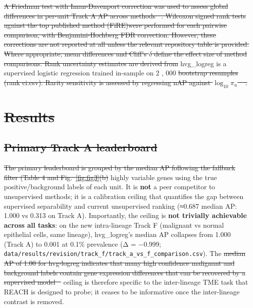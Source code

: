 \documentclass[10pt]{article}
\providecommand{\DIFaddtex}[1]{{\protect\color{trackgreen}#1}} %
\providecommand{\DIFdeltex}[1]{{\protect\color{red}\sout{#1}}}                      %
\providecommand{\DIFaddbegin}{} %
\providecommand{\DIFaddend}{} %
\providecommand{\DIFdelbegin}{} %
\providecommand{\DIFdelend}{} %
\providecommand{\DIFadd}[1]{\texorpdfstring{\DIFaddtex{#1}}{#1}} %
\providecommand{\DIFdel}[1]{\texorpdfstring{\DIFdeltex{#1}}{}} %
\newcommand{\DIFscaledelfig}{0.5}
\newlength{\DIFdelgraphicswidth} %
\newlength{\DIFdelgraphicsheight} %
\newcommand{\DIFaddincludegraphics}[2][]{{\color{trackgreen}\fbox{\DIFOincludegraphics[#1]{#2}}}} %
\newcommand{\DIFdelincludegraphics}[2][]{%
\sbox{\DIFdelgraphicsbox}{\DIFOincludegraphics[#1]{#2}}%
\settoboxwidth{\DIFdelgraphicswidth}{\DIFdelgraphicsbox} %
\settoboxtotalheight{\DIFdelgraphicsheight}{\DIFdelgraphicsbox} %
\scalebox{\DIFscaledelfig}{%
\parbox[b]{\DIFdelgraphicswidth}{\usebox{\DIFdelgraphicsbox}\\[-\baselineskip] \rule{\DIFdelgraphicswidth}{0em}}\llap{\resizebox{\DIFdelgraphicswidth}{\DIFdelgraphicsheight}{%
\setlength{\unitlength}{\DIFdelgraphicswidth}%
\begin{picture}(1,1)%
\thicklines\linethickness{2pt} %
{\color[rgb]{1,0,0}\put(0,0){\framebox(1,1){}}}%
{\color[rgb]{1,0,0}\put(0,0){\line( 1,1){1}}}%
{\color[rgb]{1,0,0}\put(0,1){\line(1,-1){1}}}%
\end{picture}%
}\hspace*{3pt}}} %
} %
\DeclareRobustCommand{\DIFaddbegin}{\DIFOaddbegin \let\includegraphics\DIFaddincludegraphics} %
\DeclareRobustCommand{\DIFaddend}{\DIFOaddend \let\includegraphics\DIFOincludegraphics} %
\DeclareRobustCommand{\DIFdelbegin}{\DIFOdelbegin \let\includegraphics\DIFdelincludegraphics} %
\DeclareRobustCommand{\DIFdelend}{\DIFOaddend \let\includegraphics\DIFOincludegraphics} %
\begin{document}
\DIFdelbegin \DIFdel{A Friedman test with Iman-Davenport correction was used to assess global differences in per-unit Track A AP across methods\mbox{%
\cite{gorodkin2004comparing}}\hskip0pt%
. Wilcoxon signed rank tests against the top published method (FiRE)were performed for each pairwise comparison, with Benjamini-Hochberg FDR correction. However, these corrections are not reported at all unless the relevant repository table is provided. Where appropriate, mean differences and Cliff’s $\delta$ define the effect size of method comparisons. Rank uncertainty estimates are derived from }\DIFdelend \DIFaddbegin \DIFadd{hvg\_logreg is a supervised logistic regression trained in-sample on
}\DIFaddend 2\DIFdelbegin %
\DIFdelend ,\DIFdelbegin %
\DIFdelend 000 \DIFdelbegin \DIFdel{bootstrap resamples (rank ci.csv). Rarity sensitivity is assessed by regressing nAP against $\log_{10} \pi_u$ \mbox{%
\cite{saito2015precision,davis2006relationship}}\hskip0pt%
.
}%

\section{\DIFdel{Results}}
\addtocounter{section}{-1}%

\subsection{\DIFdel{Primary Track A leaderboard}}
\addtocounter{subsection}{-1}%

\DIFdel{The primary leaderboard is grouped by the median AP following the fallback filter (Table 4 and Fig.~\ref{fig:fig3}(b) }\DIFdelend \DIFaddbegin \DIFadd{highly variable genes using the true positive/background labels of
each unit. It is }\textbf{\DIFadd{not}} \DIFadd{a peer competitor to unsupervised methods;
it is a calibration ceiling that quantifies the gap between supervised
separability and current unsupervised ranking (≈0.687 median AP: 1.000
vs 0.313 on Track A). Importantly, the ceiling is }\textbf{\DIFadd{not trivially
achievable across all tasks}}\DIFadd{: on the new intra-lineage Track F
(malignant vs normal epithelial cells, same lineage), hvg\_logreg's
median AP collapses from 1.000 (Track A) to 0.001 at 0.1\% prevalence (Δ
= −0.999;
}\texttt{\DIFadd{data/results/revision/track\_f/track\_a\_vs\_f\_comparison.csv}}\DIFaddend ).
The \DIFdelbegin \DIFdel{median AP of 1.00 for hvg-logreg indicates that many high confidence malignant and background labels contain gene expression differences that
can be recovered by a supervised model \mbox{%
\cite{stegle2015computational,ren2018understanding}}\hskip0pt%
}\DIFdelend \DIFaddbegin \DIFadd{ceiling is therefore specific to the inter-lineage TME task that
REACH is designed to probe; it ceases to be informative once the
inter-lineage contrast is removed}\DIFaddend .
\end{document}
